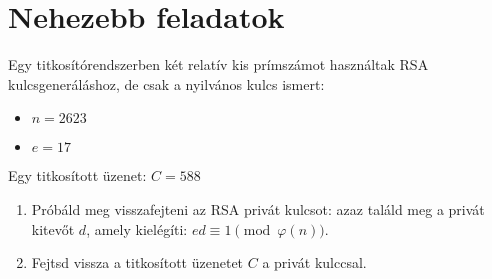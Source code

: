\section*{Nehezebb feladatok}
\begin{extraproblem}
Egy titkosítórendszerben két relatív kis prímszámot használtak RSA
kulcsgeneráláshoz, de csak a nyilvános kulcs ismert: 
\begin{itemize}
\item $n=2623$ 
\item $e=17$ 
\end{itemize}
Egy titkosított üzenet: $C=588$ 
\begin{enumerate}
\item Próbáld meg visszafejteni az RSA privát kulcsot: azaz találd meg a
privát kitevőt $d$, amely kielégíti: $ed\equiv1\pmod{\varphi(n)}$. 
\item Fejtsd vissza a titkosított üzenetet $C$ a privát kulccsal. 
\end{enumerate}
\end{extraproblem}

